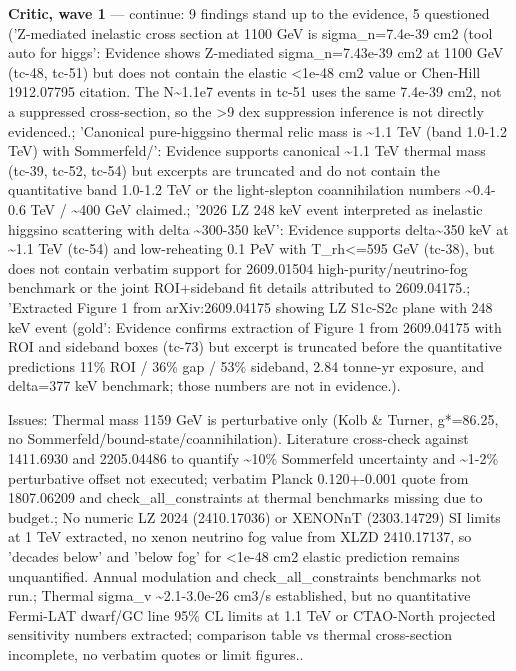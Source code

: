 \documentclass[11pt,a4paper]{article}
\begin{document}
\textbf{Critic, wave 1} --- continue: 9 findings stand up to the evidence, 5 questioned ('Z-mediated inelastic cross section at 1100 GeV is sigma\_n=7.4e-39 cm2 (tool auto for higgs': Evidence shows Z-mediated sigma\_n=7.43e-39 cm2 at 1100 GeV (tc-48, tc-51) but does not contain the elastic \textless{}1e-48 cm2 value or Chen-Hill 1912.07795 citation. The N\textasciitilde{}1.1e7 events in tc-51 uses the same 7.4e-39 cm2, not a suppressed cross-section, so the \textgreater{}9 dex suppression inference is not directly evidenced.; 'Canonical pure-higgsino thermal relic mass is \textasciitilde{}1.1 TeV (band 1.0-1.2 TeV) with Sommerfeld/': Evidence supports canonical \textasciitilde{}1.1 TeV thermal mass (tc-39, tc-52, tc-54) but excerpts are truncated and do not contain the quantitative band 1.0-1.2 TeV or the light-slepton coannihilation numbers \textasciitilde{}0.4-0.6 TeV / \textasciitilde{}400 GeV claimed.; '2026 LZ 248 keV event interpreted as inelastic higgsino scattering with delta \textasciitilde{}300-350 keV': Evidence supports delta\textasciitilde{}350 keV at \textasciitilde{}1.1 TeV (tc-54) and low-reheating 0.1 PeV with T\_rh\textless{}=595 GeV (tc-38), but does not contain verbatim support for 2609.01504 high-purity/neutrino-fog benchmark or the joint ROI+sideband fit details attributed to 2609.04175.; 'Extracted Figure 1 from arXiv:2609.04175 showing LZ S1c-S2c plane with 248 keV event (gold': Evidence confirms extraction of Figure 1 from 2609.04175 with ROI and sideband boxes (tc-73) but excerpt is truncated before the quantitative predictions 11\% ROI / 36\% gap / 53\% sideband, 2.84 tonne-yr exposure, and delta=377 keV benchmark; those numbers are not in evidence.).

Issues: Thermal mass 1159 GeV is perturbative only (Kolb \& Turner, g*=86.25, no Sommerfeld/bound-state/coannihilation). Literature cross-check against 1411.6930 and 2205.04486 to quantify \textasciitilde{}10\% Sommerfeld uncertainty and \textasciitilde{}1-2\% perturbative offset not executed; verbatim Planck 0.120+-0.001 quote from 1807.06209 and check\_all\_constraints at thermal benchmarks missing due to budget.; No numeric LZ 2024 (2410.17036) or XENONnT (2303.14729) SI limits at 1 TeV extracted, no xenon neutrino fog value from XLZD 2410.17137, so 'decades below' and 'below fog' for \textless{}1e-48 cm2 elastic prediction remains unquantified. Annual modulation and check\_all\_constraints benchmarks not run.; Thermal sigma\_v \textasciitilde{}2.1-3.0e-26 cm3/s established, but no quantitative Fermi-LAT dwarf/GC line 95\% CL limits at 1.1 TeV or CTAO-North projected sensitivity numbers extracted; comparison table vs thermal cross-section incomplete, no verbatim quotes or limit figures..
\end{document}
